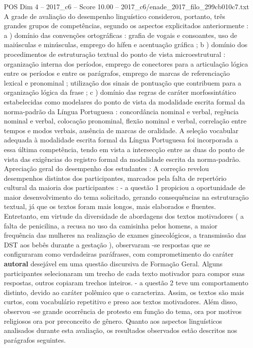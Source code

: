 \begin{textsample}{POS Dim 4 – 2017\_c6 – Score 10.00 – 2017\_c6/enade\_2017\_filo\_299cb010c7.txt}
A grade de avaliação do desempenho linguístico considerou, portanto, três grandes grupos de competências, segundo os aspectos explicitados anteriormente : a ) domínio das convenções ortográficas : grafia de vogais e consoantes, uso de maiúsculas e minúsculas, emprego do hífen e acentuação gráfica ; b ) domínio dos procedimentos de estruturação textual do ponto de vista microestrutural : organização interna dos períodos, emprego de conectores para a articulação lógica entre os períodos e entre os parágrafos, emprego de marcas de referenciação lexical e pronominal ; utilização dos sinais de pontuação que contribuem para a organização lógica da frase ; c ) domínio das regras de caráter morfossintático estabelecidas como modelares do ponto de vista da modalidade escrita formal da norma-padrão da Língua Portuguesa : concordância nominal e verbal, regência nominal e verbal, colocação pronominal, flexão nominal e verbal, correlação entre tempos e modos verbais, ausência de marcas de oralidade.
A seleção vocabular adequada à modalidade escrita formal da Língua Portuguesa foi incorporada a essa última competência, tendo em vista a intersecção entre as duas do ponto de vista das exigências do registro formal da modalidade escrita da norma-padrão.
Apreciação geral do desempenho dos estudantes : A correção revelou desempenhos distintos dos participantes, marcados pela falta de repertório cultural da maioria dos participantes : - a questão 1 propiciou a oportunidade de maior desenvolvimento do tema solicitado, gerando consequências na estruturação textual, já que os textos foram mais longos, mais elaborados e fluentes.
Entretanto, em virtude da diversidade de abordagens dos textos motivadores ( a falta de penicilina, a recusa no uso da camisinha pelos homens, a maior frequência das mulheres na realização de exames ginecológicos, a transmissão das DST aos bebês durante a gestação ), observaram -se respostas que se configuraram como verdadeiras paráfrases, com comprometimento do caráter \textbf{autoral} desejável em uma questão discursiva de Formação Geral.
Alguns participantes selecionaram um trecho de cada texto motivador para compor suas respostas, outros copiaram trechos inteiros. - a questão 2 teve um comportamento distinto, devido ao caráter polêmico que o caracteriza.
Assim, os textos são mais curtos, com vocabulário repetitivo e preso aos textos motivadores.
Além disso, observou -se grande ocorrência de protesto em função do tema, ora por motivos religiosos ora por preconceito de gênero.
Quanto aos aspectos linguísticos analisados durante esta avaliação, os resultados observados estão descritos nos parágrafos seguintes.

\end{textsample}
